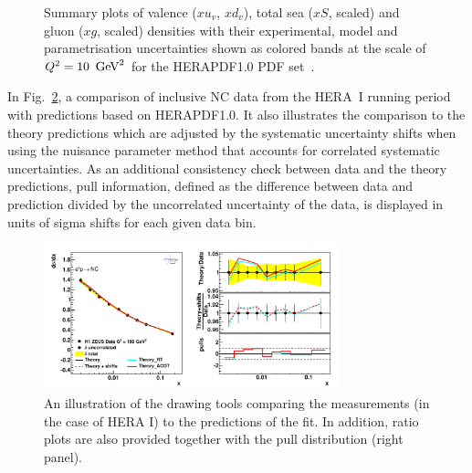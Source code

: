 \begin{description}
\begin{figure}[!ht]
   \caption{Summary plots of valence ($xu_v$, $xd_v$), total sea ($xS$, scaled) and gluon ($xg$, scaled) densities
   with their experimental, model and parametrisation uncertainties shown as colored bands at the scale 
   of $Q^2=10 \ \,\text{Ge\hspace{-.08em}V}^2$ for the HERAPDF1.0 PDF set~\cite{h1zeus:2009wt}.}
 \label{fig:hera1}
\end{figure}
In Fig.~\ref{fig:data}, a comparison of inclusive NC data from the HERA~I running period with predictions based on HERAPDF1.0. It also illustrates the comparison to the theory predictions which are adjusted by the  
systematic uncertainty shifts when using the nuisance parameter method that accounts for 
correlated systematic uncertainties. 
As an additional consistency check between data and the theory predictions, pull information, defined as the difference between data and prediction divided by the uncorrelated uncertainty of the data, is displayed in units of sigma shifts for each given data bin.

\begin{figure}[!ht]
   \centering
   \includegraphics[width=8.6cm]{datatheory.pdf}
   \caption{An illustration of the \fitter drawing tools comparing the measurements (in the case of HERA I) to the predictions of the fit. In addition, ratio plots are also provided together with the pull distribution (right panel).} 
 \label{fig:data}
\end{figure}

\end{description}
%


